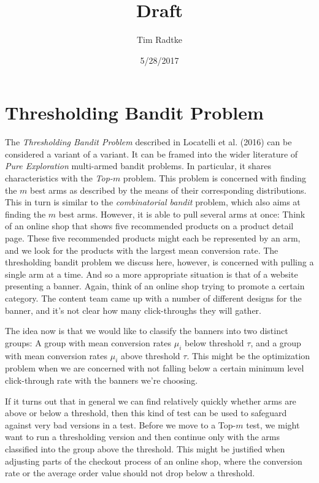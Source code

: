 \documentclass[12pt,]{article}
\title{Draft}
\author{Tim Radtke}
\date{5/28/2017}
\begin{document}
\maketitle

{
\hypersetup{linkcolor=black}
\setcounter{tocdepth}{3}
\tableofcontents
}
\section{Thresholding Bandit Problem}\label{thresholding-bandit-problem}

The \emph{Thresholding Bandit Problem} described in Locatelli et al.
(2016) can be considered a variant of a variant. It can be framed into
the wider literature of \emph{Pure Exploration} multi-armed bandit
problems. In particular, it shares characteristics with the
\emph{Top-\(m\)} problem. This problem is concerned with finding the
\(m\) best arms as described by the means of their corresponding
distributions. This in turn is similar to the \emph{combinatorial
bandit} problem, which also aims at finding the \(m\) best arms.
However, it is able to pull several arms at once: Think of an online
shop that shows five recommended products on a product detail page.
These five recommended products might each be represented by an arm, and
we look for the products with the largest mean conversion rate. The
thresholding bandit problem we discuss here, however, is concerned with
pulling a single arm at a time. And so a more appropriate situation is
that of a website presenting a banner. Again, think of an online shop
trying to promote a certain category. The content team came up with a
number of different designs for the banner, and it's not clear how many
click-throughs they will gather.

The idea now is that we would like to classify the banners into two
distinct groups: A group with mean conversion rates \(\mu_i\) below
threshold \(\tau\), and a group with mean conversion rates \(\mu_i\)
above threshold \(\tau\). This might be the optimization problem when we
are concerned with not falling below a certain minimum level
click-through rate with the banners we're choosing.

If it turns out that in general we can find relatively quickly whether
arms are above or below a threshold, then this kind of test can be used
to safeguard against very bad versions in a test. Before we move to a
Top-\(m\) test, we might want to run a thresholding version and then
continue only with the arms classified into the group above the
threshold. This might be justified when adjusting parts of the checkout
process of an online shop, where the conversion rate or the average
order value should not drop below a threshold.
\end{document}

